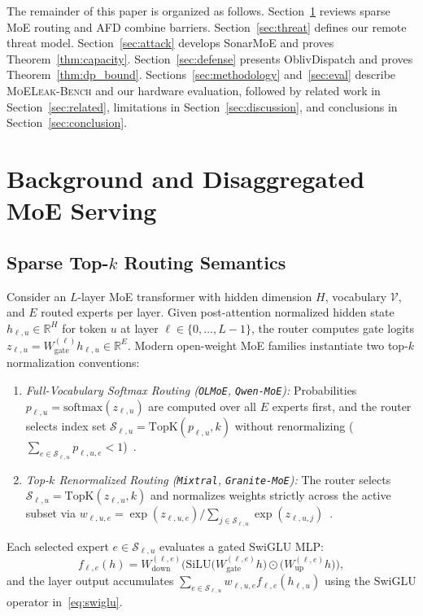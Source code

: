 \documentclass[final,5p,times,twocolumn]{elsarticle}
\def\SM{SonarMoE}%
\def\OD{OblivDispatch}%
\theoremstyle{definition}
\theoremstyle{remark}
\newcommand{\SM}{\textsc{SonarMoE}}
\newcommand{\OD}{\textsc{OblivDispatch}}
\newcommand{\MLB}{\textsc{MoELeak-Bench}}
\begin{document}
The remainder of this paper is organized as follows. Section~\ref{sec:background} reviews sparse MoE routing and AFD combine barriers. Section~\ref{sec:threat} defines our remote threat model. Section~\ref{sec:attack} develops \SM{} and proves Theorem~\ref{thm:capacity}. Section~\ref{sec:defense} presents \OD{} and proves Theorem~\ref{thm:dp_bound}. Sections~\ref{sec:methodology} and~\ref{sec:eval} describe \MLB{} and our hardware evaluation, followed by related work in Section~\ref{sec:related}, limitations in Section~\ref{sec:discussion}, and conclusions in Section~\ref{sec:conclusion}.

\section{Background and Disaggregated MoE Serving}\label{sec:background}

\subsection{Sparse Top-$k$ Routing Semantics}
Consider an $L$-layer MoE transformer with hidden dimension $H$, vocabulary $\mathcal{V}$, and $E$ routed experts per layer. Given post-attention normalized hidden state $h_{\ell, u} \in \mathbb{R}^H$ for token $u$ at layer $\ell \in \{0, \dots, L-1\}$, the router computes gate logits $z_{\ell, u} = W_{\mathrm{gate}}^{(\ell)} h_{\ell, u} \in \mathbb{R}^E$. Modern open-weight MoE families instantiate two top-$k$ normalization conventions:
\begin{enumerate}
  \item \emph{Full-Vocabulary Softmax Routing (\texttt{OLMoE}, \texttt{Qwen-MoE}):} Probabilities $p_{\ell, u} = \mathrm{softmax}(z_{\ell, u})$ are computed over all $E$ experts first, and the router selects index set $\mathcal{S}_{\ell, u} = \mathrm{TopK}(p_{\ell, u}, k)$ without renormalizing ($\sum_{e \in \mathcal{S}_{\ell, u}} p_{\ell, u, e} < 1$)~\cite{muennighoff2025olmoe,yang2024qwen2moe}.
  \item \emph{Top-$k$ Renormalized Routing (\texttt{Mixtral}, \texttt{Granite-MoE}):} The router selects $\mathcal{S}_{\ell, u} = \mathrm{TopK}(z_{\ell, u}, k)$ and normalizes weights strictly across the active subset via $w_{\ell, u, e} = \exp(z_{\ell, u, e}) / \sum_{j \in \mathcal{S}_{\ell, u}} \exp(z_{\ell, u, j})$~\cite{jiang2024mixtral,gale2023megablocks}.
\end{enumerate}
Each selected expert $e \in \mathcal{S}_{\ell, u}$ evaluates a gated SwiGLU MLP:
\begin{equation}\label{eq:swiglu}
  f_{\ell, e}(h) = W_{\mathrm{down}}^{(\ell, e)} \Big( \mathrm{SiLU}\!\big(W_{\mathrm{gate}}^{(\ell, e)} h\big) \odot \big(W_{\mathrm{up}}^{(\ell, e)} h\big) \Big),
\end{equation}
and the layer output accumulates $\sum_{e \in \mathcal{S}_{\ell, u}} w_{\ell, u, e} f_{\ell, e}(h_{\ell, u})$ using the SwiGLU operator in~\eqref{eq:swiglu}.
\end{document}
